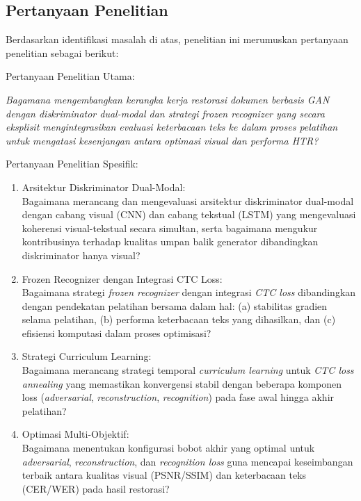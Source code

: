 \documentclass[12pt,a4paper]{book}
\begin{document}
\vspace{0pt}
\subsection{Pertanyaan Penelitian}
\label{subsec:pertanyaan-penelitian}

Berdasarkan identifikasi masalah di atas, penelitian ini merumuskan pertanyaan penelitian sebagai berikut:

\vspace{0.5em}
Pertanyaan Penelitian Utama:

\textit{Bagamana mengembangkan kerangka kerja restorasi dokumen berbasis GAN dengan diskriminator dual-modal dan strategi \textit{frozen recognizer} yang secara eksplisit mengintegrasikan evaluasi keterbacaan teks ke dalam proses pelatihan untuk mengatasi kesenjangan antara optimasi visual dan performa HTR?}

\vspace{0.8em}
Pertanyaan Penelitian Spesifik:

\begin{enumerate}[label=\arabic*., leftmargin=0.5cm]
    \item Arsitektur Diskriminator Dual-Modal: \\
    Bagaimana merancang dan mengevaluasi arsitektur diskriminator dual-modal dengan cabang visual (CNN) dan cabang tekstual (LSTM) yang mengevaluasi koherensi visual-tekstual secara simultan, serta bagaimana mengukur kontribusinya terhadap kualitas umpan balik generator dibandingkan diskriminator hanya visual?

    \item Frozen Recognizer dengan Integrasi CTC Loss: \\
    Bagaimana strategi \textit{frozen recognizer} dengan integrasi \textit{CTC loss} dibandingkan dengan pendekatan pelatihan bersama dalam hal: (a) stabilitas gradien selama pelatihan, (b) performa keterbacaan teks yang dihasilkan, dan (c) efisiensi komputasi dalam proses optimisasi?

    \item Strategi Curriculum Learning: \\
    Bagaimana merancang strategi temporal \textit{curriculum learning} untuk \textit{CTC loss annealing} yang memastikan konvergensi stabil dengan beberapa komponen loss (\textit{adversarial}, \textit{reconstruction}, \textit{recognition}) pada fase awal hingga akhir pelatihan?

    \item Optimasi Multi-Objektif: \\
    Bagaimana menentukan konfigurasi bobot akhir yang optimal untuk \textit{adversarial}, \textit{reconstruction}, dan \textit{recognition loss} guna mencapai keseimbangan terbaik antara kualitas visual (PSNR/SSIM) dan keterbacaan teks (CER/WER) pada hasil restorasi?
\end{enumerate}
\vspace{0.8em}
\end{document}

